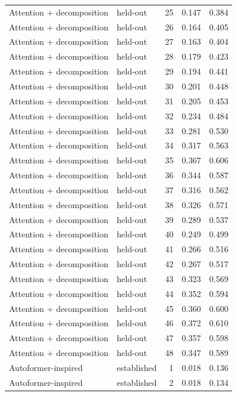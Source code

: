 \begin{tabular}{llrrr}
Attention + decomposition & held-out & 25 & 0.147 & 0.384 \\
Attention + decomposition & held-out & 26 & 0.164 & 0.405 \\
Attention + decomposition & held-out & 27 & 0.163 & 0.404 \\
Attention + decomposition & held-out & 28 & 0.179 & 0.423 \\
Attention + decomposition & held-out & 29 & 0.194 & 0.441 \\
Attention + decomposition & held-out & 30 & 0.201 & 0.448 \\
Attention + decomposition & held-out & 31 & 0.205 & 0.453 \\
Attention + decomposition & held-out & 32 & 0.234 & 0.484 \\
Attention + decomposition & held-out & 33 & 0.281 & 0.530 \\
Attention + decomposition & held-out & 34 & 0.317 & 0.563 \\
Attention + decomposition & held-out & 35 & 0.367 & 0.606 \\
Attention + decomposition & held-out & 36 & 0.344 & 0.587 \\
Attention + decomposition & held-out & 37 & 0.316 & 0.562 \\
Attention + decomposition & held-out & 38 & 0.326 & 0.571 \\
Attention + decomposition & held-out & 39 & 0.289 & 0.537 \\
Attention + decomposition & held-out & 40 & 0.249 & 0.499 \\
Attention + decomposition & held-out & 41 & 0.266 & 0.516 \\
Attention + decomposition & held-out & 42 & 0.267 & 0.517 \\
Attention + decomposition & held-out & 43 & 0.323 & 0.569 \\
Attention + decomposition & held-out & 44 & 0.352 & 0.594 \\
Attention + decomposition & held-out & 45 & 0.360 & 0.600 \\
Attention + decomposition & held-out & 46 & 0.372 & 0.610 \\
Attention + decomposition & held-out & 47 & 0.357 & 0.598 \\
Attention + decomposition & held-out & 48 & 0.347 & 0.589 \\
Autoformer-inspired & established & 1 & 0.018 & 0.136 \\
Autoformer-inspired & established & 2 & 0.018 & 0.134 \\

\end{tabular}
